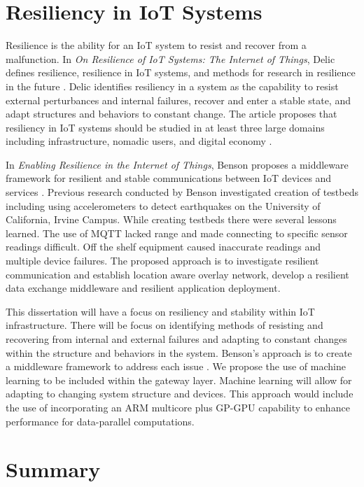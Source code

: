 \documentclass[../main.tex]{subfiles}
\begin{document}
\section{Resiliency in IoT Systems}

Resilience is the ability for an IoT system to resist and recover from a malfunction. In \textit{On Resilience of IoT Systems: The Internet of Things}, Delic defines resilience, resilience in IoT systems, and methods for research in resilience in the future \cite{Delic:2016:RIS:2891279.2822885}. Delic identifies resiliency in a system as the capability to resist external perturbances and internal failures, recover and enter a stable state, and adapt structures and behaviors to constant change. The article proposes that resiliency in IoT systems should be studied in at least three large domains including infrastructure, nomadic users, and digital economy \cite{Delic:2016:RIS:2891279.2822885}. 

In \textit{Enabling Resilience in the Internet of Things}, Benson proposes a middleware framework for resilient and stable communications between IoT devices and services \cite{7134032}. Previous research conducted by Benson investigated creation of testbeds including using accelerometers to detect earthquakes on the University of California, Irvine Campus. While creating testbeds there were several lessons learned. The use of MQTT lacked range and made connecting to specific sensor readings difficult. Off the shelf equipment caused inaccurate readings and multiple device failures. The proposed approach is to investigate resilient communication and establish location aware overlay network, develop a resilient data exchange middleware and resilient application deployment. 


This dissertation will have a focus on resiliency and stability within IoT infrastructure. There will be focus on identifying methods of resisting and recovering from internal and external failures and adapting to constant changes within the structure and behaviors in the system. Benson's approach is to create a middleware framework to address each issue \cite{7134032}. We propose the use of machine learning to be included within the gateway layer. Machine learning will allow for adapting to changing system structure and devices. This approach would include the use of incorporating an ARM multicore plus GP-GPU capability to enhance performance for data-parallel computations. 

\section{Summary}
\end{document}
